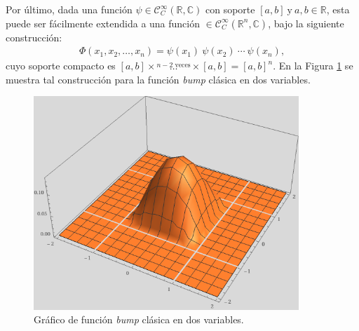 \documentclass[spanish, fleqn]{article}
\begin{document}
\begin{description}
	Por último, dada una función $\psi \in \mathcal{C}_{C}^{\infty}(\mathbb{R},\mathbb{C})$ con soporte $[a,b] \ \text{y} \ a,b \in \mathbb{R}$, esta puede ser fácilmente extendida a una función $\in \mathcal{C}_{C}^{\infty}(\mathbb{R}^n,\mathbb{C})$, bajo la siguiente construcción:
	\begin{align}
	\Phi(x_1,x_2,\ldots,x_n) = \psi(x_1)\ \psi(x_2)\ \cdots \ \psi(x_n),
	\label{eq:ndbump}
	\end{align}
	cuyo soporte compacto es $[a,b]\times \stackrel{n-2 \text{ veces}}{\ldots} \times [a,b]=[a,b]^n$. En la Figura \ref{fig:3dbump} se muestra tal construcción para la función \textit{bump} clásica en dos variables.
	
	\begin{figure}[htpb!]
	\centering
	\includegraphics[width=10cm]{3dbump}
	\caption{Gráfico de función \textit{bump} clásica en dos variables.}
	\label{fig:3dbump}
	\end{figure}




\end{description}
\end{document}
